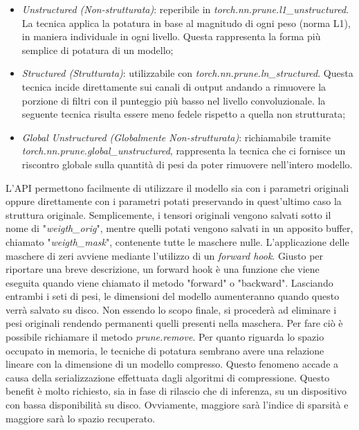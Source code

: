\begin{itemize}
    \item \emph{Unstructured (Non-strutturata)}: reperibile in \emph{torch.nn.prune.l1\_unstructured}. La tecnica applica la potatura in base al magnitudo di ogni peso (norma L1), in maniera individuale in ogni livello. Questa rappresenta la forma più semplice di potatura di un modello;
    \item \emph{Structured (Strutturata)}:  utilizzabile con \emph{torch.nn.prune.ln\_structured}. Questa tecnica incide direttamente sui canali di output andando a rimuovere la porzione di filtri con il punteggio più basso nel livello convoluzionale. la seguente tecnica risulta essere meno fedele rispetto a quella non strutturata;
    \item \emph{Global Unstructured (Globalmente Non-strutturata)}: richiamabile tramite \emph{torch.nn.prune.global\_unstructured}, rappresenta la tecnica che ci fornisce un riscontro globale sulla quantità di pesi da poter rimuovere nell'intero modello.
\end{itemize}
L'API permettono facilmente di utilizzare il modello sia con i parametri originali oppure direttamente con i parametri potati preservando in quest'ultimo caso la struttura originale. Semplicemente, i tensori originali vengono salvati sotto il nome di "\emph{weigth\_orig}", mentre quelli potati vengono salvati in un apposito buffer, chiamato "\emph{weigth\_mask}", contenente tutte le maschere nulle. L'applicazione delle maschere di zeri avviene mediante l'utilizzo di un \emph{forward hook}. Giusto per riportare una breve descrizione, un forward hook è una funzione che viene eseguita quando viene chiamato il metodo "forward" o "backward". Lasciando entrambi i seti di pesi, le dimensioni del modello aumenteranno quando questo verrà salvato su disco. Non essendo lo scopo finale, si procederà ad eliminare i pesi originali rendendo permanenti quelli presenti nella maschera. Per fare ciò è possibile richiamare il metodo \emph{prune.remove}. 
Per quanto riguarda lo spazio occupato in memoria, le tecniche di potatura sembrano avere una relazione lineare con la dimensione di un modello compresso. Questo fenomeno accade a causa della serializzazione effettuata dagli algoritmi di compressione.
Questo benefit è molto richiesto, sia in fase di rilascio che di inferenza, su un dispositivo con bassa disponibilità su disco. Ovviamente, maggiore sarà l'indice di sparsità e maggiore sarà lo spazio recuperato. 

